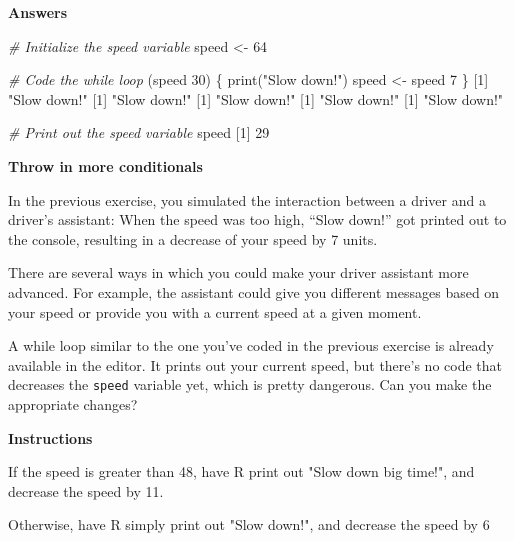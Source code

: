 \documentclass[]{article}
\newcommand{\hlnum}[1]{\textcolor[rgb]{0.816,0.125,0.439}{#1}}%
\newcommand{\hlstr}[1]{\textcolor[rgb]{0.251,0.627,0.251}{#1}}%
\newcommand{\hlcom}[1]{\textcolor[rgb]{0.502,0.502,0.502}{\textit{#1}}}%
\newcommand{\hlstd}[1]{\textcolor[rgb]{0.251,0.251,0.251}{#1}}%
\newcommand{\hlkwd}[1]{\textcolor[rgb]{0.878,0.439,0.125}{#1}}%
\newenvironment{Shaded}{\begin{myshaded}}{\end{myshaded}}
\newcommand{\KeywordTok}[1]{\hlkwd{#1}}
\newcommand{\DecValTok}[1]{\hlnum{#1}}
\newcommand{\StringTok}[1]{\hlstr{#1}}
\newcommand{\CommentTok}[1]{\hlcom{#1}}
\newcommand{\NormalTok}[1]{\hlstd{#1}}
\begin{document}
\textbf{Answers}

\begin{Shaded}
\begin{Highlighting}[]
\CommentTok{# Initialize the speed variable}
\NormalTok{speed <-}\StringTok{ }\DecValTok{64}

\CommentTok{# Code the while loop}
\NormalTok{ (speed }\OperatorTok{>}\StringTok{ }\DecValTok{30}\NormalTok{) \{}
  \KeywordTok{print}\NormalTok{(}\StringTok{"Slow down!"}\NormalTok{)}
\NormalTok{  speed <-}\StringTok{ }\NormalTok{speed }\OperatorTok{-}\StringTok{ }\DecValTok{7}
\NormalTok{\}}
\NormalTok{   [}\DecValTok{1}\NormalTok{] }\StringTok{"Slow down!"}
\NormalTok{   [}\DecValTok{1}\NormalTok{] }\StringTok{"Slow down!"}
\NormalTok{   [}\DecValTok{1}\NormalTok{] }\StringTok{"Slow down!"}
\NormalTok{   [}\DecValTok{1}\NormalTok{] }\StringTok{"Slow down!"}
\NormalTok{   [}\DecValTok{1}\NormalTok{] }\StringTok{"Slow down!"}

\CommentTok{# Print out the speed variable}
\NormalTok{speed}
\NormalTok{   [}\DecValTok{1}\NormalTok{] }\DecValTok{29}
\end{Highlighting}
\end{Shaded}

\textbf{Throw in more conditionals}

In the previous exercise, you simulated the interaction between a driver
and a driver's assistant: When the speed was too high, ``Slow down!''
got printed out to the console, resulting in a decrease of your speed by
7 units.

There are several ways in which you could make your driver assistant
more advanced. For example, the assistant could give you different
messages based on your speed or provide you with a current speed at a
given moment.

A while loop similar to the one you've coded in the previous exercise is
already available in the editor. It prints out your current speed, but
there's no code that decreases the \texttt{speed} variable yet, which is
pretty dangerous. Can you make the appropriate changes?

\textbf{Instructions}

\begin{Shaded}
\begin{Highlighting}[]
\OperatorTok{*}\StringTok{ }\NormalTok{If the speed is greater than }\DecValTok{48}\NormalTok{, have R print out }\StringTok{"Slow down big time!"}\NormalTok{, and decrease the speed by }\DecValTok{11}\NormalTok{.}

\OperatorTok{*}\StringTok{ }\NormalTok{Otherwise, have R simply print out }\StringTok{"Slow down!"}\NormalTok{, and decrease the speed by }\DecValTok{6}
\end{Highlighting}
\end{Shaded}
\end{document}
